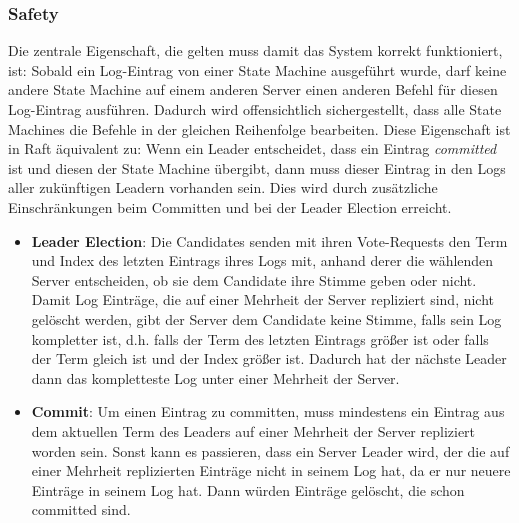 \subsubsection{Safety}

Die zentrale Eigenschaft, die gelten muss damit das System korrekt funktioniert, ist: Sobald ein Log-Eintrag von einer State Machine ausgeführt wurde, darf keine andere State Machine auf einem anderen Server einen anderen Befehl für diesen Log-Eintrag ausführen. Dadurch wird offensichtlich sichergestellt, dass alle State Machines die Befehle in der gleichen Reihenfolge bearbeiten. Diese Eigenschaft ist in Raft äquivalent zu: Wenn ein Leader entscheidet, dass ein Eintrag \textit{committed} ist und diesen der State Machine übergibt, dann muss dieser Eintrag in den Logs aller zukünftigen Leadern vorhanden sein. Dies wird durch zusätzliche Einschränkungen beim Committen und bei der Leader Election erreicht.

\begin{itemize}
	\item \textbf{Leader Election}: Die Candidates senden mit ihren Vote-Requests den Term und Index des letzten Eintrags ihres Logs mit, anhand derer die wählenden Server entscheiden, ob sie dem Candidate ihre Stimme geben oder nicht. Damit Log Einträge, die auf einer Mehrheit der Server repliziert sind, nicht gelöscht werden, gibt der Server dem Candidate keine Stimme, falls sein Log kompletter ist, d.h. falls der Term des letzten Eintrags größer ist oder falls der Term gleich ist und der Index größer ist. Dadurch hat der nächste Leader dann das kompletteste Log unter einer Mehrheit der Server.
	\item \textbf{Commit}: Um einen Eintrag zu committen, muss mindestens ein Eintrag aus dem aktuellen Term des Leaders auf einer Mehrheit der Server repliziert worden sein. Sonst kann es passieren, dass ein Server Leader wird, der die auf einer Mehrheit replizierten Einträge nicht in seinem Log hat, da er nur neuere Einträge in seinem Log hat. Dann würden Einträge gelöscht, die schon committed sind. 
\end{itemize}
